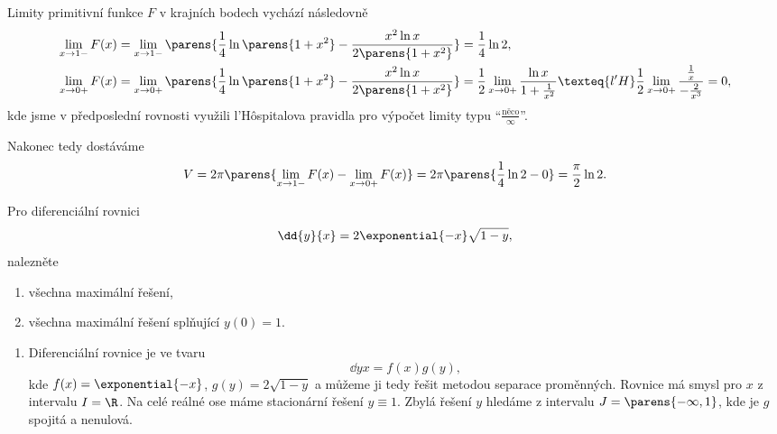 \documentclass[answers]{exam}
\begin{document}
\begin{questions}
\begin{solution}
  	Limity primitivní funkce $F$ v krajních bodech vychází následovně
  	\begin{align*}
  		\lim_{x \to 1-} F(x)
  		&=
  		\lim_{x \to 1-}
  		\parens{
	  		\frac{1}{4} \ln \parens{1 + x^2}
	  		-
	  		\frac{x^2 \ln x}{2 \parens{1 + x^2}}
  		}
  		=
  		\frac{1}{4} \ln 2,
  		\\
  		\lim_{x \to 0+} F(x)
  		&=
  		\lim_{x \to 0+}
  		\parens{
	  		\frac{1}{4} \ln \parens{1 + x^2}
	  		-
	  		\frac{x^2 \ln x}{2 \parens{1 + x^2}}
  		}
  		=
  		\frac{1}{2} \lim_{x \to 0+}
  		\frac{\ln x}{1 + \frac{1}{x^2}}
  		\texteq{l'H}
  		\frac{1}{2} \lim_{x \to 0+}
  		\frac{\frac{1}{x}}{-\frac{2}{x^3}}  
  		=
  		0,		
  	\end{align*}
    kde jsme v předposlední rovnosti využili l'Hôspitalova pravidla pro výpočet limity typu ``$\frac{\textrm{něco}}{\infty}$''.  
    	
  	Nakonec tedy dostáváme
  	\begin{equation*}
  		V 
  		= 
  		2 \pi \parens{ \lim_{x \to 1-} F(x) - \lim_{x \to 0+} F(x)}
  		=
  		2 \pi \parens{\frac{1}{4} \ln 2 - 0}
  		=
  		\frac{\pi}{2} \ln 2.
  	\end{equation*}
  \end{solution}

  \question Pro diferenciální rovnici
  \begin{equation*}
    \dd{y}{x}
    =
    2 \exponential{-x} \sqrt{1 - y},
  \end{equation*}
  nalezněte
	\begin{enumerate}[label=(\roman*)]
		\item všechna maximální řešení,
		\item všechna maximální řešení splňující $y(0) = 1$.
	\end{enumerate}
  
  \begin{solution}
	\begin{enumerate}[label=(\roman*)]
		\item
	  	Diferenciální rovnice je ve tvaru
	  	\begin{equation*}
	    \dd{y}{x}
	    =
	    f(x) g(y), 	
	  	\end{equation*}
	  	kde $f(x) = \exponential{-x}$, $g(y) = 2 \sqrt{1 - y}$ a můžeme ji tedy řešit metodou separace proměnných. Rovnice má smysl pro $x$ z intervalu $I = \R$. Na celé reálné ose máme stacionární řešení $y \equiv 1$. Zbylá řešení $y$ hledáme z intervalu $J = \parens{-\infty, 1}$, kde je $g$ spojitá a nenulová.
	  	

\end{enumerate}
\end{solution}
\end{questions}
\end{document}
